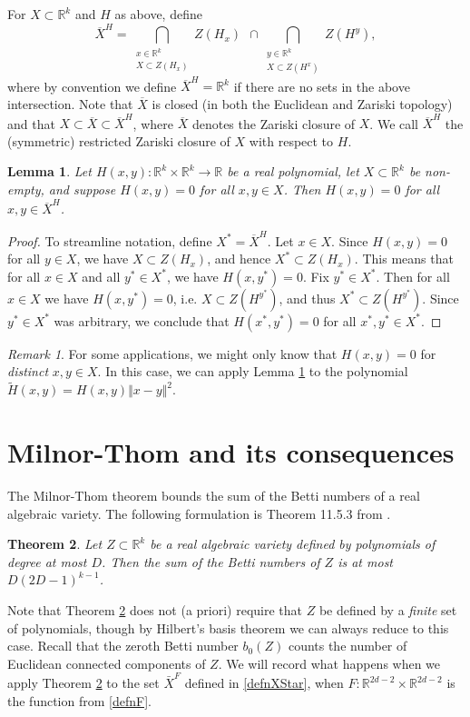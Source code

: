 \documentclass[letterpaper, reqno, 11pt]{article}
\numberwithin{equation}{section}
\newcommand{\RR}{\mathbb{R}}
\newtheorem{thm}{Theorem}[section]
\newtheorem{lem}[thm]{Lemma}
\theoremstyle{remark}
\newtheorem{rem}{Remark}[section]
\begin{document}
For $X\subset\RR^k$ and $H$ as above, define
\begin{equation}\label{defnXStar}
\overline X^H = \bigcap_{\substack{x\in\RR^k\\ X\subset Z(H_x)}}\!\!\!Z(H_x)\ \ \cap\bigcap_{\substack{y\in\RR^k\\ X\subset Z(H^x)}}\!\!\!Z(H^y),
\end{equation}
where by convention we define $\overline X^H=\RR^k$ if there are no sets in the above intersection. Note that $\overline X$ is closed (in both the Euclidean and Zariski topology) and that $X\subset \overline X\subset \overline X^H$, where $\overline X$ denotes the Zariski closure of $X$. We call $\overline X^H$ the (symmetric) restricted Zariski closure of $X$ with respect to $H$. 

\begin{lem}\label{HClosureLem}
Let $H(x,y)\colon \RR^{k}\times\RR^k\to\RR$ be a real polynomial, let $X\subset\RR^k$ be non-empty, and suppose $H(x,y)=0$ for all $x,y\in X$. Then $H(x,y)=0$ for all $x,y\in \overline X^H$.
\end{lem}
\begin{proof} 
To streamline notation, define $X^* = \overline X^H$. Let $x\in X$. Since $H(x,y)=0$ for all $y\in X$, we have $X\subset Z(H_x)$, and hence $X^*\subset Z(H_x)$. This means that for all $x\in X$ and all $y^*\in X^*$, we have $H(x,y^*) = 0$. Fix $y^*\in X^*$. Then for all $x\in X$ we have $H(x,y^*) = 0$, i.e. $X\subset Z(H^{y^*})$, and thus $X^*\subset Z(H^{y^*})$. Since $y^*\in X^*$ was arbitrary, we conclude that $H(x^*,y^*)=0$ for all $x^*,y^*\in X^*$.
\end{proof}
\begin{rem}
For some applications, we might only know that $H(x,y) = 0$ for \emph{distinct} $x,y\in X$. In this case, we can apply Lemma \ref{HClosureLem} to the polynomial $\tilde H(x,y) = H(x,y)\Vert x-y\Vert^2$. 
\end{rem}



\section{Milnor-Thom and its consequences}
The Milnor-Thom theorem \cite{Milnor1964, Thom1965} bounds the sum of the Betti numbers of a real algebraic variety. The following formulation is Theorem 11.5.3 from \cite{BCR}.
\begin{thm}\label{milnorThomThm}
Let $Z \subset\RR^k$ be a real algebraic variety defined by polynomials of degree at most $D$. Then the sum of the Betti numbers of $Z$ is at most $D(2D-1)^{k-1}$.
\end{thm}
Note that Theorem \ref{milnorThomThm} does not (a priori) require that $Z$ be defined by a \emph{finite} set of polynomials, though by Hilbert's basis theorem we can always reduce to this case.
%
%
Recall that the zeroth Betti number $b_0(Z)$ counts the number of Euclidean connected components of $Z$. We will record what happens when we apply Theorem \ref{milnorThomThm} to the set $\bar X^F$ defined in \eqref{defnXStar}, when $F\colon\RR^{2d-2}\times\RR^{2d-2}$ is the function from \eqref{defnF}.
\end{document}
